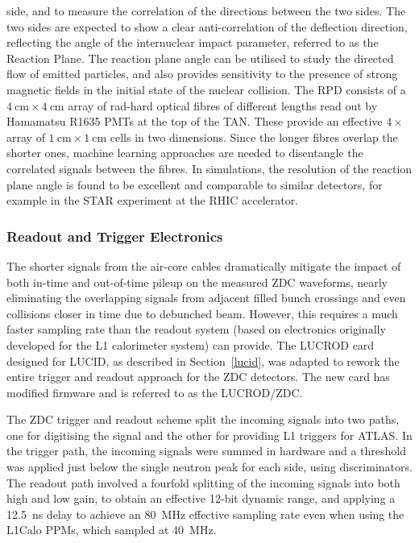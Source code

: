 \documentclass[cernpreprint, atlasdraft=false, UKenglish,british,orcidlogo, texmf, orcidlogo]{atlasdoc}
\begin{document}
\begin{itemize}
side, and to measure the correlation of the directions between the
two sides.  The two sides are expected to show a clear
anti-correlation of the deflection direction, reflecting the angle
of the internuclear impact parameter, referred to as the
Reaction Plane.  The reaction plane angle can be utilised to
study the directed flow 
of emitted particles, and also
provides sensitivity to the presence of strong magnetic fields in
the initial state of the nuclear collision.  The \gls{RPD} consists of a $\SI{4}{\cm}\times\SI{4}{\cm}$ array of rad-hard optical fibres of different lengths read
out by Hamamatsu R1635 \glspl{PMT} at the top of the \gls{TAN}.  These provide an
effective $4\times $ array of $\SI{1}{\cm} \times \SI{1}{\cm}$ cells in two dimensions.  Since
the longer fibres overlap the shorter ones, machine learning
approaches are needed to disentangle the correlated signals between
the fibres.  In simulations, the resolution of the reaction plane
angle is found to be excellent and comparable to similar
detectors, for example in the STAR experiment at the RHIC accelerator.
 
\end{itemize}
\subsubsection{ Readout and Trigger Electronics}
The shorter signals from the air-core cables dramatically
mitigate the impact of both in-time and out-of-time pileup on the
measured \gls{ZDC} waveforms, nearly eliminating the overlapping signals
from adjacent filled bunch crossings and even collisions closer in
time due to debunched beam.  However, this requires a much faster
sampling rate than the \RunTwo readout system (based on
electronics originally developed for the \gls{L1} calorimeter system) can provide.
The \gls{LUCROD} card designed for \gls{LUCID}, as described in Section~\ref{lucid}, was adapted to rework the entire trigger and readout
approach for the \gls{ZDC} detectors.  The new card has modified
firmware and is referred to as the \gls{LUCROD}/\gls{ZDC}.
 
The \RunTwo \gls{ZDC} trigger
and readout scheme split the incoming signals into two
paths, one for digitising the signal and the other for providing
\gls{L1} triggers for ATLAS.  In the trigger path, the incoming \analog signals were summed
in hardware and a threshold was applied just below the single neutron peak for each side, using 
discriminators.  The readout path involved a fourfold splitting of the
incoming signals into both high and low gain, to obtain an effective 12-bit dynamic range,
and applying a \SI{12.5}{\ns} delay to achieve an \SI{80}{\MHz} effective sampling rate even when using the \gls{L1Calo} \glspl{PPM},
which sampled at \SI{40}{\MHz}.
 
\end{document}
